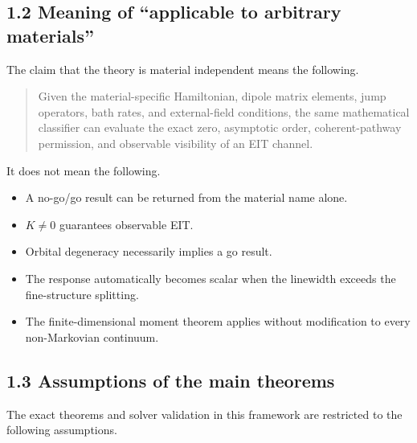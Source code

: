 \documentclass[
  10pt,
  a4paper,
]{article}
\providecommand{\tightlist}{%
  \setlength{\itemsep}{0pt}\setlength{\parskip}{0pt}}
\begin{document}
\subsection{1.2 Meaning of ``applicable to arbitrary
materials''}\label{meaning-of-applicable-to-arbitrary-materials}

The claim that the theory is material independent means the following.

\begin{quote}
Given the material-specific Hamiltonian, dipole matrix elements, jump
operators, bath rates, and external-field conditions, the same
mathematical classifier can evaluate the exact zero, asymptotic order,
coherent-pathway permission, and observable visibility of an EIT
channel.
\end{quote}

It does not mean the following.

\begin{itemize}
\tightlist
\item
  A no-go/go result can be returned from the material name alone.
\item
  \(K\neq0\) guarantees observable EIT.
\item
  Orbital degeneracy necessarily implies a go result.
\item
  The response automatically becomes scalar when the linewidth exceeds
  the fine-structure splitting.
\item
  The finite-dimensional moment theorem applies without modification to
  every non-Markovian continuum.
\end{itemize}

\subsection{1.3 Assumptions of the main
theorems}\label{assumptions-of-the-main-theorems}

The exact theorems and solver validation in this framework are
restricted to the following assumptions.
\end{document}
